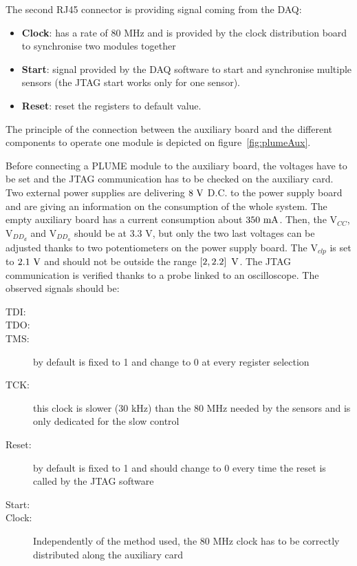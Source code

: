   The second RJ45 connector is providing signal coming from the DAQ:
  \begin{itemize}
    \item \textbf{Clock}: has a rate of 80 MHz and is provided by the clock distribution board to synchronise two modules together
    \item \textbf{Start}: signal provided by the DAQ software to start and synchronise multiple sensors (the JTAG start works only for one sensor).
    \item \textbf{Reset}: reset the registers to default value. 
  \end{itemize}

  The principle of the connection between the auxiliary board and the different components to operate one module is depicted on figure~\ref{fig:plumeAux}.

  Before connecting a PLUME module to the auxiliary board, the voltages have to be set and the \gls{JTAG} communication has to be checked on the auxiliary card.
  Two external power supplies are delivering $8~\rm{V}$ D.C. to the power supply board and are giving an information on the consumption of the whole system.
  The empty auxiliary board has a current consumption about $350~\rm{mA}$.
  Then, the $\text{V}_{CC}$, $\text{V}_{DD_d}$ and $\text{V}_{DD_a}$ should be at 3.3 V, but only the two last voltages can be adjusted thanks to two potentiometers on the power supply board.
  The $\text{V}_{clp}$ is set to $2.1~\rm{V}$ and should not be outside the range $\left[2, 2.2\right]~\rm{V}$.
  The JTAG communication is verified thanks to a probe linked to an oscilloscope.
  The observed signals should be:

  \begin{description}
    \item[TDI:]
    \item[TDO:]
    \item[TMS:] by default is fixed to 1 and change to 0 at every register selection
    \item[TCK:] this clock is slower (30 kHz) than the 80 MHz needed by the sensors and is only dedicated for the slow control
    \item[Reset:] by default is fixed to 1 and should change to 0 every time the reset is called by the JTAG software
    \item[Start:] 
    \item[Clock:] Independently of the method used, the 80 MHz clock has to be correctly distributed along the auxiliary card
  \end{description}


